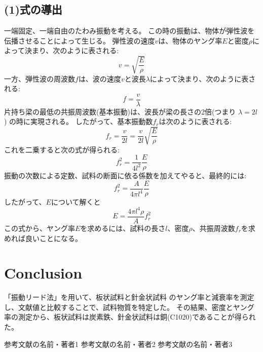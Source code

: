 \documentclass[a4paper,11pt]{jsarticle}
\begin{document}
\subsection{(1)式の導出}
一端固定、一端自由のたわみ振動を考える。
この時の振動は、物体が弾性波を伝播させることによって生じる。
弾性波の速度$v$は、物体のヤング率$E$と密度$\rho$によって決まり、次のように表される:
\begin{equation}
  v = \sqrt{\frac{E}{\rho}}
\end{equation}
一方、弾性波の周波数$f$は、波の速度$v$と波長$\lambda$によって決まり、次のように表される:
\begin{equation}
  f = \frac{v}{\lambda}
\end{equation}
片持ち梁の最低の共振周波数(基本振動)は、波長が梁の長さの2倍(つまり $\lambda=2l$)
の時に実現される。
したがって、基本振動数$f_r$は次のように表される:
\begin{equation}
  f_r = \frac{v}{2l} = \frac{v}{2l}\sqrt{\frac{E}{\rho}}
\end{equation}
これを二乗すると次の式が得られる:
\begin{equation}
  f_r^2 = \frac{1}{4l^2}\frac{E}{\rho}
\end{equation}
振動の次数による定数、試料の断面に依る係数を加えてやると、最終的には:
\begin{equation}
  f_r^2 = \frac{A}{4\pi l^4}\frac{E}{\rho} 
\end{equation}
したがって、$E$について解くと
\begin{equation}
  E = \frac{4\pi l^4 \rho}{A}f_r^2
\end{equation}
この式から、ヤング率$E$を求めるには、試料の長さ$l$、密度$\rho$、共振周波数$f_r$を求めれば良いことになる。
\section{Conclusion}
「振動リード法」を用いて、板状試料と針金状試料
のヤング率と減衰率を測定し、文献値と比較することで、試料物質を特定した。
その結果、密度とヤング率の測定から、板状試料は炭素鉄、針金状試料は銅(C1020)であることが得られた。

\begin{thebibliography}{文献数}
 参考文献の名前・著者1
 参考文献の名前・著者2
 参考文献の名前・著者3
\end{thebibliography}
\end{document}
